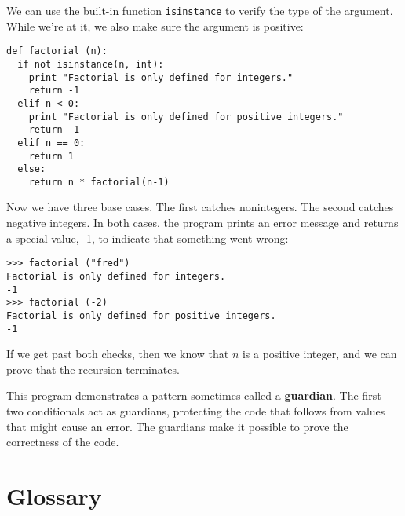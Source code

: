 We can use the built-in function {\tt isinstance} to verify the type of the
argument.  While we're
at it, we also make sure the argument is positive:

\beforeverb
\begin{verbatim}
def factorial (n):
  if not isinstance(n, int):
    print "Factorial is only defined for integers."
    return -1
  elif n < 0:
    print "Factorial is only defined for positive integers."
    return -1
  elif n == 0:
    return 1
  else:
    return n * factorial(n-1)
\end{verbatim}
\afterverb
%
Now we have three base cases.  The first catches
nonintegers.  The second catches negative integers.  In both cases,
the program prints an error message and returns a special value, -1, to
indicate that something went wrong:

\beforeverb
\begin{verbatim}
>>> factorial ("fred")
Factorial is only defined for integers.
-1
>>> factorial (-2)
Factorial is only defined for positive integers.
-1
\end{verbatim}
\afterverb
%
If we get past both checks, then we know that $n$ is a positive
integer, and we can prove that the recursion terminates.

This program demonstrates a pattern sometimes called a {\bf guardian}.
The first two conditionals act as guardians, protecting the
code that follows from values that might cause an error.  The guardians
make it possible to prove the correctness of the code.


\section{Glossary}

